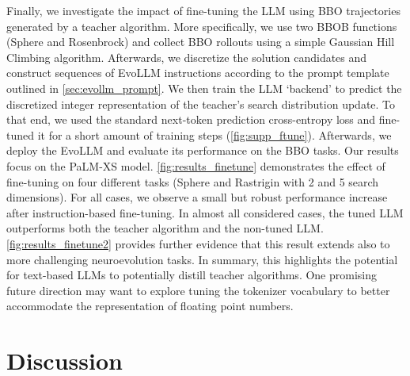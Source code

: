 Finally, we investigate the impact of fine-tuning the LLM using BBO trajectories generated by a teacher algorithm. More specifically, we use two BBOB functions (Sphere and Rosenbrock) and collect BBO rollouts using a simple Gaussian Hill Climbing algorithm. Afterwards, we discretize the solution candidates and construct sequences of EvoLLM instructions according to the prompt template outlined in \cref{sec:evollm_prompt}.
%
We then train the LLM `backend' to predict the discretized integer representation of the teacher's search distribution update. To that end, we used the standard next-token prediction cross-entropy loss and fine-tuned it for a short amount of training steps (\cref{fig:supp_ftune}). Afterwards, we deploy the EvoLLM and evaluate its performance on the BBO tasks. Our results focus on the PaLM-XS model. 
%
\cref{fig:results_finetune} demonstrates the effect of fine-tuning on four different tasks (Sphere and Rastrigin with 2 and 5 search dimensions). For all cases, we observe a small but robust performance increase after instruction-based fine-tuning. In almost all considered cases, the tuned LLM outperforms both the teacher algorithm and the non-tuned LLM.
\cref{fig:results_finetune2} provides further evidence that this result extends also to more challenging neuroevolution tasks.
%
In summary, this highlights the potential for text-based LLMs to potentially distill teacher algorithms. One promising future direction may want to explore tuning the tokenizer vocabulary to better accommodate the representation of floating point numbers.

\section{Discussion}

